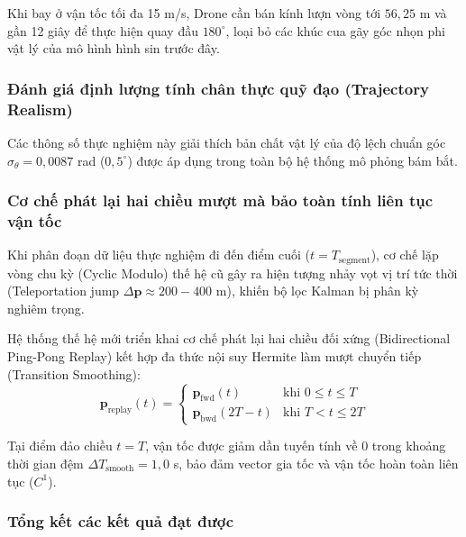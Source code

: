 Khi bay ở vận tốc tối đa 15 m/s, Drone cần bán kính lượn vòng tới $56{,}25$ m và gần 12 giây để thực hiện quay đầu $180^\circ$, loại bỏ các khúc cua gãy góc nhọn phi vật lý của mô hình hình sin trước đây.



\subsubsection{Đánh giá định lượng tính chân thực quỹ đạo (Trajectory Realism)}

\hspace{0.5cm} Các thông số thực nghiệm này giải thích bản chất vật lý của độ lệch chuẩn góc $\sigma_\theta = 0{,}0087$ rad ($0{,}5^\circ$) được áp dụng trong toàn bộ hệ thống mô phỏng bám bắt.

\subsubsection{Cơ chế phát lại hai chiều mượt mà bảo toàn tính liên tục vận tốc}

\hspace{0.5cm} Khi phân đoạn dữ liệu thực nghiệm đi đến điểm cuối ($t = T_{\text{segment}}$), cơ chế lặp vòng chu kỳ (Cyclic Modulo) thế hệ cũ gây ra hiện tượng nhảy vọt vị trí tức thời (Teleportation jump $\Delta \mathbf{p} \approx 200 - 400$ m), khiến bộ lọc Kalman bị phân kỳ nghiêm trọng.

Hệ thống thế hệ mới triển khai cơ chế phát lại hai chiều đối xứng (Bidirectional Ping-Pong Replay) kết hợp đa thức nội suy Hermite làm mượt chuyển tiếp (Transition Smoothing):
\begin{equation}
\mathbf{p}_{\text{replay}}(t) = \begin{cases}
\mathbf{p}_{\text{fwd}}(t) & \text{khi } 0 \le t \le T \\
\mathbf{p}_{\text{bwd}}(2T - t) & \text{khi } T < t \le 2T
\end{cases}
\label{eq:bidirectional-replay-piecewise}
\end{equation}

Tại điểm đảo chiều $t = T$, vận tốc được giảm dần tuyến tính về 0 trong khoảng thời gian đệm $\Delta T_{\text{smooth}} = 1{,}0$ s, bảo đảm vector gia tốc và vận tốc hoàn toàn liên tục ($C^1$).

\subsubsection{Tổng kết các kết quả đạt được}

